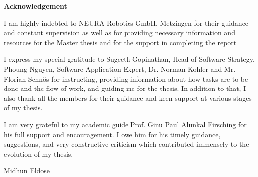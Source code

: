 \documentclass[12pt]{article}
\begin{document}
\newpage
\tableofcontents
\newpage
\listoffigures
{}
\newpage
\listoftables
{}
\newpage
\raggedright
\newpage
\raggedright
{}
\begin{center}
    \textbf{Acknowledgement}
\end{center}
    \raggedright

    I am highly indebted to NEURA Robotics GmbH, Metzingen for their guidance and constant supervision as well as for providing necessary information and resources for the Master thesis and for the support in completing the report

    \vspace{1cm}
    
    I express my special gratitude to Sugeeth Gopinathan, Head of Software Strategy, Phoung Nguyen, Software Application Expert, Dr. Norman Kohler and Mr. Florian Schnös for instructing, providing information about how tasks are to be done and the flow of work, and guiding me for the thesis. In addition to that, I also thank all the members for their guidance and keen support at various stages of my thesis.

    \vspace{1cm}

    I am very grateful to my academic guide Prof. Ginu Paul Alunkal Firsching for his full support and encouragement. I owe him for his timely guidance, suggestions, and very constructive criticism which contributed immensely to the evolution of my thesis.
    
    \vspace{1.5 cm}
    
    \raggedleft
    Midhun Eldose


\newpage
\end{document}
